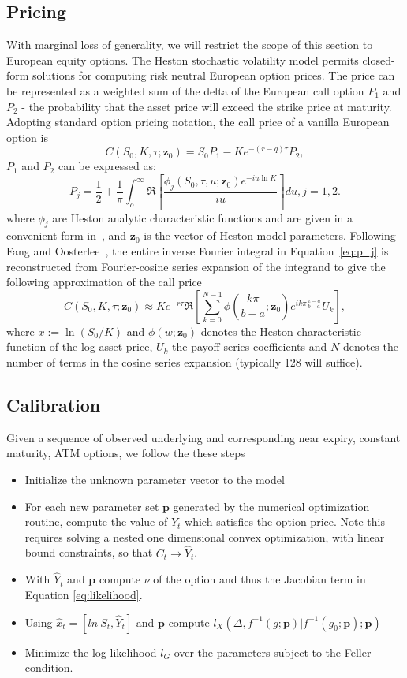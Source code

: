 \documentclass{article}
\newcommand{\be}{\begin{equation}}
\newcommand{\ee}{\end{equation}}
\begin{document}
\subsection{Pricing}
With marginal loss of generality, we will restrict the scope of this section to European equity options. The Heston stochastic volatility model permits closed-form solutions for computing risk neutral European option prices. The price can be represented as a weighted sum of the delta of the European call option $P_1$ and $P_2$ - the probability that the asset price will
exceed the strike price at maturity. Adopting standard option pricing notation, the call price of a vanilla European option is
\be
 C(S_0, K,\tau; \mathbf{z}_0) = S_0P_1 - Ke^{-(r-q )\tau}P_2,
\ee
$P_1$ and $P_2$ can be expressed as:
\be \label{eq:p_j}
P_j =\frac{1}{2} + \frac{1}{\pi} \int_{o}^{\infty} \Re\left[\frac{\phi_j (S_0,\tau,u; \mathbf{z}_0)e^{-iu \ln K}}{iu}\right]du, j=1,2.
\ee
where $\phi_j$ are Heston analytic characteristic functions and are given in a convenient form in~\cite{KIENITZ2012}, and $\mathbf{z}_0$ is the vector of Heston model parameters.  Following Fang and Oosterlee~\cite{FANG2008}, the entire inverse Fourier integral in Equation~\eqref{eq:p_j} is reconstructed from Fourier-cosine series expansion of the integrand to give the following approximation of the call price
\be
C(S_0, K, \tau; \mathbf{z}_0) \approx Ke^{-r\tau} \Re\left[\sum_{k=0}^{N-1}\phi\left(\frac{k\pi}{b-a};\mathbf{z}_0\right)e^{ik\pi\frac{x - a}{b-a}}U_k\right],
\ee
where $x:= \ln(S_0/K)$ and $\phi(w;\mathbf{z}_0)$ denotes the Heston characteristic function of the log-asset price, $U_k$ the payoff series coefficients and $N$ denotes the number of terms in the cosine series expansion (typically 128 will suffice).

\subsection{Calibration}

Given a sequence of observed underlying and corresponding near expiry, constant maturity, ATM options, we follow the these steps

\begin{itemize}
\item Initialize the unknown parameter vector to the model
\item For each new parameter set $\mathbf{p}$ generated by the numerical optimization routine, compute the value of $Y_t$ which satisfies the option price. Note this requires solving a nested one dimensional convex optimization, with linear bound constraints, so that $C_t \rightarrow \hat{Y}_t$.
\item With $\hat{Y}_t$ and $\mathbf{p}$ compute $\nu$ of the option and thus the Jacobian term in Equation \ref{eq:likelihood}.
\item Using $\hat{x}_t=[ln~S_t, \hat{Y}_t]$ and $\mathbf{p}$ compute $l_X(\Delta, f^{-1}(g;\mathbf{p})| f^{-1}(g_0;\mathbf{p});\mathbf{p})$
\item Minimize the log likelihood $l_G$ over the parameters subject to the Feller condition. 
\end{itemize}
\end{document}
